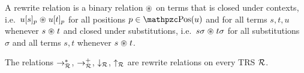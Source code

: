 %
\begin{definition}\label{def:closed-under}
	A {\myem rewrite relation} is a binary relation $\mathrel{\circledast}$ on terms that is {\myem closed under contexts},
	i.e.~$u[s]_p\mathrel{\circledast} u[t]_p$ %
	for all positions $p\in\pos(u)$ and
	for all terms $s,t,u$ whenever $s\mathrel{\circledast} t$
	and {\myem closed under substitutions}, 
	i.e.~$s\sigma\mathrel{\circledast} t\sigma$ %
	for all substitutions $\sigma$
	and all terms $s,t$ whenever $s\mathrel{\circledast} t$.
\end{definition}
\begin{lemma}
	The relations $\rightarrow^*_{\mathcal R}$, 
	$\rightarrow^+_{\mathcal R}$,
	$\downarrow_{\mathcal R}$, $\uparrow_{\mathcal R}$ are rewrite relations on every TRS ${\mathcal R}$.
\end{lemma}



